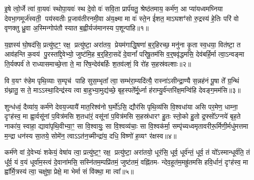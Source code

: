 

\setcounter{anuvakam}{0}
इ॒षे त्वो॒र्जे त्वा॑ वा॒यवः॑ स्थोपा॒यवः॑ स्थ दे॒वो वः॑ सवि॒ता प्रार्प॑यतु॒ श्रेष्ठ॑तमाय॒ कर्म॑ण॒ आ प्या॑यध्वमघ्निया देवभा॒गमूर्ज॑स्वती॒ पय॑स्वतीः प्र॒जाव॑तीरनमी॒वा अ॑य॒क्ष्मा मा वः॑ स्ते॒न ई॑शत॒ मा\-ऽघशꣳ॑सो रु॒द्रस्य॑ हे॒तिः परि॑ वो वृणक्तु ध्रु॒वा अ॒स्मिन्गोप॑तौ स्यात ब॒ह्वीर्यज॑मानस्य प॒शून्पा॑हि॥१॥

{\anuvakamend[{इ॒षे त्रिच॑त्वारिꣳशत्। (1)}]}

य॒ज्ञस्य॑ घो॒षद॑सि॒ प्रत्यु॑ष्ट॒ꣳ॒ रक्ष॒ प्रत्यु॑ष्टा॒ अरा॑तय॒ प्रेयम॑गाद्धि॒षणा॑ ब॒र्॒हिरच्छ॒ मनु॑ना कृ॒ता स्व॒धया॒ वित॑ष्टा॒ त आव॑हन्ति क॒वय॑ पु॒रस्ता᳚द्दे॒वेभ्यो॒ जुष्ट॑मि॒ह ब॒र्॒हिरा॒सदे॑ दे॒वानां᳚ परिषू॒तम॑सि व॒र्॒षवृ॑द्धमसि॒ देव॑बर्\mbox{}हि॒र्मा त्वा॒\-ऽन्वङ्मा ति॒र्यक्पर्व॑ ते राध्यासमाच्छे॒त्ता ते॒ मा रि॑ष॒न्देव॑बर्\mbox{}हिः श॒तव॑ल्\mbox{}शं॒ वि रो॑ह स॒हस्र॑वल्\mbox{}शाः॥२॥

वि व॒यꣳ रु॑हेम पृथि॒व्याः स॒म्पृच॑ पाहि सुस॒म्भृता᳚ त्वा॒ सम्भ॑रा॒म्यदि॑त्यै॒ रास्ना॑\-ऽसीन्द्रा॒ण्यै स॒न्नह॑नं पू॒षा ते᳚ ग्र॒न्थिं ग्र॑थ्नातु॒ स ते॒ मा\-ऽ\-ऽस्था॒दिन्द्र॑स्य त्वा बा॒हुभ्या॒मुद्य॑च्छे॒ बृह॒स्पते᳚र्मू॒र्ध्ना ह॑राम्यु॒र्व॑न्तरि॑क्ष॒मन्वि॑हि देवङ्ग॒मम॑सि॥३॥

{\anuvakamend[{स॒हस्र॑वल्\mbox{}शा अ॒ष्टात्रिꣳ॑शच्च। (2)}]}

शुन्ध॑ध्वं॒ दैव्या॑य॒ कर्म॑णे देवय॒ज्यायै॑ मात॒रिश्व॑नो घ॒र्मो॑\-ऽसि॒ द्यौर॑सि पृथि॒व्य॑सि वि॒श्वधा॑या असि पर॒मेण॒ धाम्ना॒ दृꣳह॑स्व॒ मा ह्वा॒र्वसू॑नां प॒वित्र॑मसि श॒तधा॑रं॒ वसू॑नां प॒वित्र॑मसि स॒हस्र॑धारꣳ हु॒तः स्तो॒को हु॒तो द्र॒फ्सो᳚\-ऽग्नये॑ बृह॒ते नाका॑य॒ स्वाहा॒ द्यावा॑पृथि॒वीभ्या॒ꣳ॒ सा वि॒श्वायुः॒ सा वि॒श्वव्य॑चाः॒ सा वि॒श्वक॑र्मा॒ सम्पृ॑च्यध्वमृतावरीरू॒र्मिणी॒र्मधु॑मत्तमा म॒न्द्रा धन॑स्य सा॒तये॒ सोमे॑न॒ त्वा\-ऽ\-ऽत॑न॒च्मीन्द्रा॑य॒ दधि॒ विष्णो॑ ह॒व्यꣳ र॑क्षस्व॥४॥

{\anuvakamend[{सोमे॑ना॒ष्टौ च॑। (3)}]}

कर्म॑णे वां दे॒वेभ्यः॑ शकेयं॒ वेषा॑य त्वा॒ प्रत्यु॑ष्ट॒ꣳ॒ रक्ष॒ प्रत्यु॑ष्टा॒ अरा॑तयो॒ धूर॑सि॒ धूर्व॒ धूर्व॑न्तं॒ धूर्व॒ तं यो᳚\-ऽस्मान्धूर्व॑ति॒ तं धू᳚र्व॒ यं व॒यं धूर्वा॑म॒स्त्वं दे॒वाना॑मसि॒ सस्नि॑तम॒म्पप्रि॑तमं॒ जुष्ट॑तमं॒ वह्नि॑तम- न्देव॒हूत॑म॒मह्रु॑तमसि हवि॒र्धानं॒ दृꣳह॑स्व॒ मा ह्वा᳚र्मि॒त्रस्य॑ त्वा॒ चक्षु॑षा॒ प्रेक्षे॒ मा भेर्मा सं वि॑क्था॒ मा त्वा᳚॥५॥

